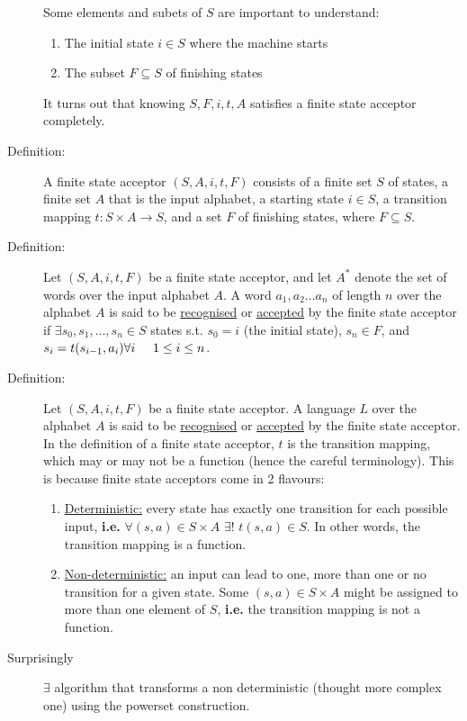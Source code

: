 \documentclass[10pt]{article}
\begin{document}
\begin{description}
		Some elements and subets of $S$ are important to understand:
		\begin{enumerate}
			\item The initial state $i \in S$ where the machine starts
			\item The subset $F \subseteq S$ of finishing states
		\end{enumerate}
		It turns out that knowing $S, F, i, t, A$ satisfies a finite state acceptor completely.
		\item[Definition:] A finite state acceptor $(S, A, i, t, F)$ consists of a finite set $S$ of states, a finite set $A$ that is the input alphabet, a starting state $i \in S$, a transition mapping $t: S \times A \rightarrow S$, and a set $F$ of finishing states, where $F \subseteq S$.
		\item[Definition:] Let $(S, A, i, t, F)$ be a finite state acceptor, and let $A^*$ denote the set of words over the input alphabet $A$. A word $a_1, a_2\dots a_n$ of length $n$ over the alphabet $A$ is said to be \underline{recognised} or \underline{accepted} by the finite state acceptor if $\exists s_0, s_1, \dots, s_n \in S$ states s.t. $s_0 = i$ (the initial state), $s_n \in F$, and $s_i = t(s_{i-1}, a_i) \forall i \hspace{5mm} 1 \leq i \leq n$.
		\item[Definition:] Let $(S, A, i, t, F)$ be a finite state acceptor. A language $L$ over the alphabet $A$ is said to be \underline{recognised} or \underline{accepted} by the finite state acceptor. \\
		In the definition of a finite state acceptor, $t$ is the transition mapping, which may or may not be a function (hence the careful terminology). This is because finite state acceptors come in 2 flavours:
		\begin{enumerate}
			\item \underline{Deterministic:} every state has exactly one transition for each possible input, \textbf{i.e.} $\forall (s, a) \in S \times A$ $\exists!$ $t(s, a) \in S$. In other words, the transition mapping is a function.
			\item \underline{Non-deterministic:} an input can lead to one, more than one or no transition for a given state. Some $(s, a) \in S \times A$ might be assigned to more than one element of $S$, \textbf{i.e.} the transition mapping is not a function.
		\end{enumerate}
		\item[Surprisingly] $\exists$ algorithm that transforms a non deterministic (thought more complex one) using the powerset construction. \\

\end{description}
\end{document}
